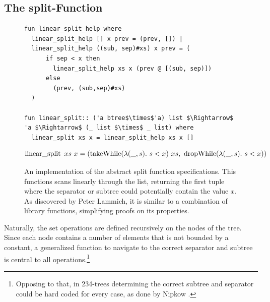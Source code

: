 \subsection{The split-Function}

\begin{figure}
    
\begin{lstlisting}[mathescape=true, language=Isabelle]
fun linear_split_help where
  linear_split_help [] x prev = (prev, []) |
  linear_split_help ((sub, sep)#xs) x prev = (
      if sep < x then
        linear_split_help xs x (prev @ [(sub, sep)])
      else
        (prev, (sub,sep)#xs)
  )

fun linear_split:: ('a btree$\times$'a) list $\Rightarrow$ 'a $\Rightarrow$ (_ list $\times$ _ list) where
  linear_split xs x = linear_split_help xs x []
\end{lstlisting}
\begin{lemma}
    \begin{equation*}
    \operatorname{linear\_split}\ xs\ x = (\operatorname{takeWhile} (\lambda(\_,s).\ s < x)\ xs,\ \operatorname{dropWhile} (\lambda(\_,s).\ s < x))
    \end{equation*}
\end{lemma}
\caption[An implementation of the abstract split function specifications.]
{An implementation of the abstract split function specifications.
This functions scans linearly through the list, returning the first tuple where the separator
or subtree could potentially contain the value $x$.
As discovered by Peter Lammich,
it is similar to a combination of library functions, simplifying proofs on its properties.}
\label{fig:linear_split}

\end{figure}

Naturally, the set operations are defined recursively on the nodes of the tree.
Since each node contains a number of elements that is not bounded by a constant,
a generalized function to navigate to the correct separator and subtree
is central to all operations.\footnote{
    Opposing to that, in 234-trees determining the correct subtree
    and separator could be hard coded for every case, as done by Nipkow \parencite{DBLP:conf/itp/Nipkow16}.
}

